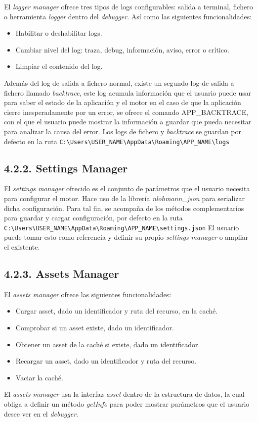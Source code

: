 El \textit{logger manager} ofrece tres tipos de logs configurables: salida a terminal, fichero o herramienta \textit{logger} dentro del \textit{debugger}. 
Así como las siguientes funcionalidades:
\begin{itemize}
    \item Habilitar o deshabilitar logs.
    \item Cambiar nivel del log: traza, debug, información, aviso, error o crítico.
    \item Limpiar el contenido del log.
\end{itemize}
Además del log de salida a fichero normal, existe un segundo log de salida a fichero llamado \textit{backtrace},
este log acumula información que el usuario puede usar para saber el estado de la aplicación y el motor en
el caso de que la aplicación cierre inesperadamente por un error, se ofrece el comando APP\_BACKTRACE, con el que 
el usuario puede mostrar la información a guardar que pueda necesitar para analizar la causa del error.
Los logs de fichero y \textit{backtrace} se guardan por defecto en la ruta \verb+C:\Users\USER_NAME\AppData\Roaming\APP_NAME\logs+

\subsection*{4.2.2. Settings Manager}\label{sec:workflow_managers_settings}

El \textit{settings manager} ofrecido es el conjunto de parámetros que el usuario necesita para configurar el motor. Hace uso de
la librería \textit{nlohmann\_json}\cite{nlohmann_json} para serializar dicha configuración. Para tal fin, se acompaña de
los métodos complementarios para guardar y cargar configuración, por defecto en la ruta \verb+C:\Users\USER_NAME\AppData\Roaming\APP_NAME\settings.json+
El usuario puede tomar esto como referencia y definir su propio \textit{settings manager} o ampliar el existente.

\subsection*{4.2.3. Assets Manager}\label{sec:workflow_managers_assets}

El \textit{assets manager} ofrece las siguientes funcionalidades:
\begin{itemize}
    \item Cargar asset, dado un identificador y ruta del recurso, en la caché.
    \item Comprobar si un asset existe, dado un identificador.
    \item Obtener un asset de la caché si existe, dado un identificador.
    \item Recargar un asset, dado un identificador y ruta del recurso.
    \item Vaciar la caché.
\end{itemize}
El \textit{assets manager} usa la interfaz \textit{asset} dentro
de la estructura de datos, la cual obliga a definir un método \textit{getInfo} para poder mostrar
parámetros que el usuario desee ver en el \textit{debugger}.


